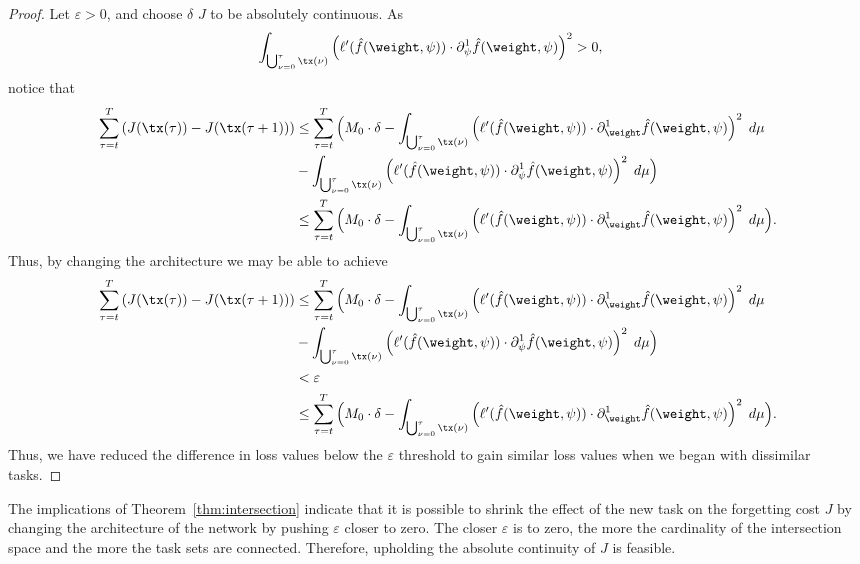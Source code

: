 \begin{proof}
    Let $\varepsilon >0$, and choose $\delta$ $J$ to be absolutely continuous. As
    \begin{align*}
        \displaystyle\int_{\bigcup_{\nu = 0}^\tau\tx(\nu)} \left(\ell'(\hat{f}(\weight,\psi))\cdot \partial_{\psi}^1 \hat{f}(\weight,\psi)\right)^2 & >0,
    \end{align*}
    notice that
    \begin{align*}
         \sum_{\tau = t}^{T} \left(J(\tx(\tau)) - J(\tx(\tau+1))\right)
        & \leq \sum_{\tau =t}^{T} \Big( M_0\cdot \delta - \displaystyle\int_{\bigcup_{\nu = 0}^\tau\tx(\nu)} \left(\ell'(\hat{f}(\weight,\psi))\cdot \partial_{\weight}^1 \hat{f}(\weight,\psi)\right)^2 \hspace{1mm}  d\mu\\
        & -\displaystyle\int_{\bigcup_{\nu = 0}^\tau\tx(\nu)} \left(\ell'(\hat{f}(\weight,\psi))\cdot \partial_{\psi}^1 \hat{f}(\weight,\psi)\right)^2 \hspace{1mm}  d\mu \Big)\\
        & \leq \sum_{\tau =t}^{T} \Big( M_0\cdot \delta - \displaystyle\int_{\bigcup_{\nu = 0}^\tau\tx(\nu)} \left(\ell'(\hat{f}(\weight,\psi))\cdot \partial_{\weight}^1 \hat{f}(\weight,\psi)\right)^2 \hspace{1mm}  d\mu \Big).
    \end{align*}
    Thus, by changing the architecture we may be able to achieve
    \begin{align*}
         \sum_{\tau = t}^{T} \left(J(\tx(\tau)) - J(\tx(\tau+1))\right)
        & \leq \sum_{\tau =t}^{T} \Big( M_0\cdot \delta - \displaystyle\int_{\bigcup_{\nu = 0}^\tau\tx(\nu)} \left(\ell'(\hat{f}(\weight,\psi))\cdot \partial_{\weight}^1 \hat{f}(\weight,\psi)\right)^2 \hspace{1mm}  d\mu\\
        & -\displaystyle\int_{\bigcup_{\nu = 0}^\tau\tx(\nu)} \left(\ell'(\hat{f}(\weight,\psi))\cdot \partial_{\psi}^1 \hat{f}(\weight,\psi)\right)^2 \hspace{1mm}  d\mu \Big)\\
        & <\varepsilon\\
        & \leq \sum_{\tau =t}^{T} \Big( M_0\cdot \delta - \displaystyle\int_{\bigcup_{\nu = 0}^\tau\tx(\nu)} \left(\ell'(\hat{f}(\weight,\psi))\cdot \partial_{\weight}^1 \hat{f}(\weight,\psi)\right)^2 \hspace{1mm}  d\mu \Big).
        \end{align*}
    Thus, we have reduced the difference in loss values below the $\varepsilon$ threshold to gain similar loss values when we began with dissimilar tasks.
\end{proof}
The implications of Theorem~\ref{thm:intersection} indicate that it is possible to shrink the effect of the new task on the forgetting cost $J$ by changing the architecture of the network by pushing $\varepsilon$ closer to zero. The closer $\varepsilon$ is to zero, the more the cardinality of the intersection space and the more the task sets are connected. Therefore, upholding the absolute continuity of $J$ is feasible. 

